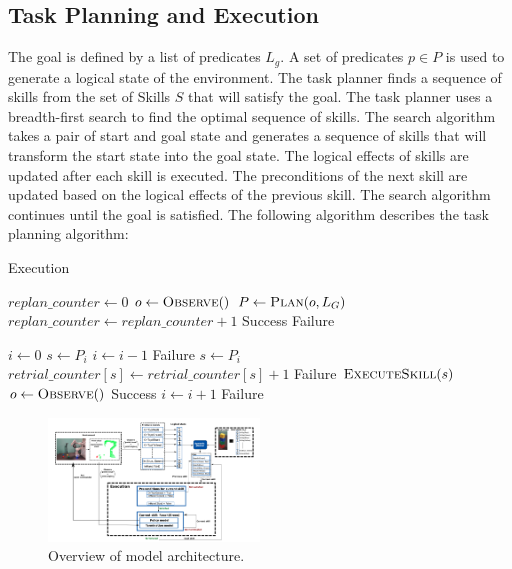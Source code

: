 \documentclass[
	a4paper, %
	10pt, %
	unnumberedsections, %
	twoside, %
]{LTJournalArticle}
\begin{document}
\subsection{Task Planning and Execution}
The goal is defined by a list of predicates \(L_g\). A set of predicates \(p \in P\) is used to generate a logical state of the environment. The task planner finds a
sequence of skills from the set of Skills \(S\) that will satisfy the goal. The task planner uses a breadth-first search to find the optimal sequence of skills. 
The search algorithm takes a pair of start and goal state and generates a sequence of skills that will transform the start state into the goal state. The logical effects
of skills are updated after each skill is executed. The preconditions of the next skill are updated based on the logical effects of the previous skill. The search algorithm
continues until the goal is satisfied. The following algorithm describes the task planning algorithm:
\begin{algorithm}
	\caption{Execution}
	\begin{algorithmic}[1]
		\State $replan\_counter \gets 0$
			\State $o \gets \textsc{Observe}()$
			\State $P \gets \textsc{Plan}(o, L_G)$
			\State $replan\_counter \gets replan\_counter + 1$
				\State \Return Success
			\EndIf
		\EndWhile
		\State \Return Failure
	\EndProcedure
	
		\State $i \gets 0$
			\State $s \gets P_i$
				\State $i \gets i - 1$
					\State \Return Failure
				\EndIf
				\State $s \gets P_i$
			\EndWhile
			\State $retrial\_counter[s] \gets retrial\_counter[s] + 1$
				\State \Return Failure
			\EndIf
			\State $\textsc{ExecuteSkill}(s)$
			\State $o \gets \textsc{Observe}()$
				\State \Return Success
			\EndIf
			\State $i \gets i + 1$
		\EndWhile
		\State \Return Failure
	\EndProcedure
\end{algorithmic}
\end{algorithm}	

\begin{figure}[htb]
	\centering
	\includegraphics[width=0.5\textwidth]{figures/arch_diagram.png}
	\caption{Overview of model architecture.}
	\label{fig:yourlabel}
  \end{figure}
  
\end{document}
